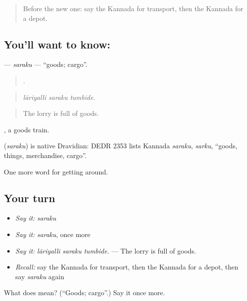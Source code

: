 \begin{quote}
Before the new one: say the Kannada for transport, then the Kannada for a depot.
\end{quote}

\subsection*{You'll want to know: }
\textbf{} — \emph{saraku} — \textquotedblleft{}goods; cargo\textquotedblright{}.

\begin{quote}
  .
\end{quote}

\begin{quote}
\emph{lāriyalli saraku tumbide.}
\end{quote}

\begin{quote}
The lorry is full of goods.
\end{quote}

 , a goods train.

\begin{cousinweb}
\textbf{} (\emph{saraku}) is native Dravidian: DEDR 2353 lists Kannada \emph{saraku}, \emph{sarku}, \textquotedblleft{}goods, things, merchandise, cargo\textquotedblright{}.
\end{cousinweb}

\begin{grammarlens}[title={What you've built}]
One more word for getting around.
\end{grammarlens}

\subsection*{Your turn}
\begin{itemize}
\raggedright
  \item \emph{Say it:} \emph{saraku}
  \item \emph{Say it:} \emph{saraku}, once more
  \item \emph{Say it:} \emph{lāriyalli saraku tumbide.} — The lorry is full of goods.
  \item \emph{Recall:} say the Kannada for transport, then the Kannada for a depot, then say \emph{saraku} again
\end{itemize}

\begin{tcolorbox}[breakable,colback=teal!4,colframe=teal!35!black,title={Before you move on}]
What does  mean? (\textquotedblleft{}Goods; cargo\textquotedblright{}.) Say it once more.
\end{tcolorbox}

